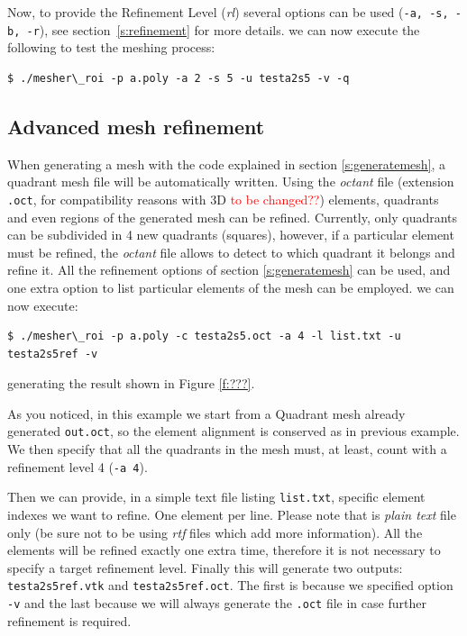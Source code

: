 \documentclass[10pt]{article}
\begin{document}
Now, to provide the Refinement Level (\textit{rl}) several options can be used (\texttt{-a, -s, -b, -r}), see section~\ref{s:refinement} for more details.
we can now execute the following to test the meshing process:
{\small
\begin{verbatim}
$ ./mesher\_roi -p a.poly -a 2 -s 5 -u testa2s5 -v -q
\end{verbatim}
}
\subsection{Advanced mesh refinement}
\label{refinemesh}

When generating a mesh with the code explained in section \ref{s:generatemesh}, a quadrant mesh file will be automatically written. Using the \textit{octant} file (extension \texttt{.oct}, for compatibility reasons with 3D \textcolor{red}{to be changed??}) elements, quadrants and even regions of the generated mesh can be refined. Currently, only quadrants can be subdivided in 4 new quadrants (squares), however, if a particular element must be refined, the \textit{octant} file allows to detect to which quadrant it belongs and refine it. All the refinement options of section \ref{s:generatemesh} can be used, and one extra option to list particular elements of the mesh can be employed.
we can now execute: 
{\small
\begin{verbatim}
$ ./mesher\_roi -p a.poly -c testa2s5.oct -a 4 -l list.txt -u testa2s5ref -v
\end{verbatim}
}
generating the result shown in Figure \ref{f:???}.

As you noticed, in this example we start from a Quadrant mesh already generated \texttt{out.oct}, so the element alignment is conserved as in previous example. We then specify that all the quadrants in the mesh must, at least, count with a refinement level 4 (\texttt{-a 4}). 

Then we can provide, in a simple text file listing \texttt{list.txt}, specific element indexes we want to refine. One element per line. Please note that is \textit{plain text} file only (be sure not to be using \textit{rtf} files which add more information).
All the elements will be refined exactly one extra time, therefore it is not necessary to specify a target refinement level. Finally this will generate two outputs: \texttt{testa2s5ref.vtk} and \texttt{testa2s5ref.oct}. The first is because we specified option \texttt{-v} and the last because we will always generate the \texttt{.oct} file in case further refinement is required. 
%
%
\end{document}
